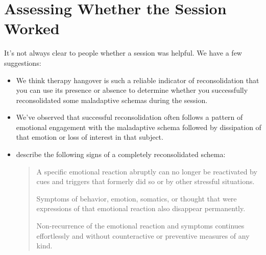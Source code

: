 \documentclass[12pt,letterpaper]{book}
\begin{document}
\section{Assessing Whether the Session Worked}
It's not always clear to people whether a session was helpful. We have a few suggestions:
\begin{itemize}
    \item We think therapy hangover is such a reliable indicator of reconsolidation that you can use its presence or absence to determine whether you successfully reconsolidated some maladaptive schemas during the session.
    \item We've observed that successful reconsolidation often follows a pattern of emotional engagement with the maladaptive schema followed by dissipation of that emotion or loss of interest in that subject.
    \item \textcite{eckerUnlocking} describe the following signs of a completely reconsolidated schema:
    \begin{quotation}
        A specific emotional reaction abruptly can no longer be reactivated by cues and triggers that formerly did so or by other stressful situations.
        
        Symptoms of behavior, emotion, somatics, or thought that were expressions of that emotional reaction also disappear permanently.
        
        Non-recurrence of the emotional reaction and symptoms continues effortlessly and without counteractive or preventive measures of any kind.
    \end{quotation}
\end{itemize}
\end{document}

